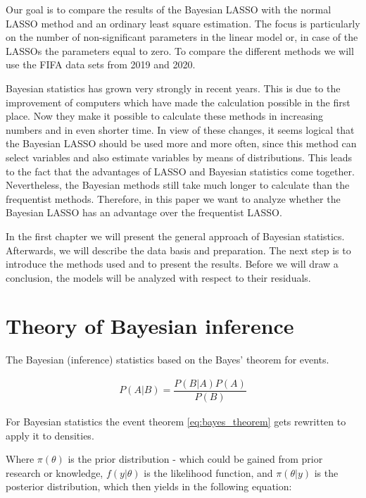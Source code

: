 \documentclass[12pt,a4paper]{article}
\begin{document}
Our goal is to compare the results of the Bayesian \ac{LASSO} with the
normal \ac{LASSO} method and an ordinary least square estimation. The
focus is particularly on the number of non-significant parameters in the
linear model or, in case of the \acp{LASSO} the parameters equal to
zero. To compare the different methods we will use the FIFA data sets
from 2019 and 2020.

Bayesian statistics has grown very strongly in recent years. This is due
to the improvement of computers which have made the calculation possible
in the first place. Now they make it possible to calculate these methods
in increasing numbers and in even shorter time. In view of these
changes, it seems logical that the Bayesian LASSO should be used more
and more often, since this method can select variables and also estimate
variables by means of distributions. This leads to the fact that the
advantages of LASSO and Bayesian statistics come together. Nevertheless,
the Bayesian methods still take much longer to calculate than the
frequentist methods. Therefore, in this paper we want to analyze whether
the Bayesian LASSO has an advantage over the frequentist LASSO.

In the first chapter we will present the general approach of Bayesian
statistics. Afterwards, we will describe the data basis and preparation.
The next step is to introduce the methods used and to present the
results. Before we will draw a conclusion, the models will be analyzed
with respect to their residuals.

\newpage

\hypertarget{theory-of-bayesian-inference}{%
\section{Theory of Bayesian
inference}\label{theory-of-bayesian-inference}}

The Bayesian (inference) statistics based on the Bayes' theorem for
events.

\begin{align}
\label{eq:bayes_theorem}
  P(A | B) = \dfrac{P (B | A) P(A)}{P(B)}
\end{align}

For Bayesian statistics the event theorem \eqref{eq:bayes_theorem} gets
rewritten to apply it to densities.

Where \(\pi (\theta)\) is the prior distribution - which could be gained
from prior research or knowledge, \(f(y | \theta )\) is the likelihood
function, and \(\pi (\theta| y)\) is the posterior distribution, which
then yields in the following equation:
\end{document}
